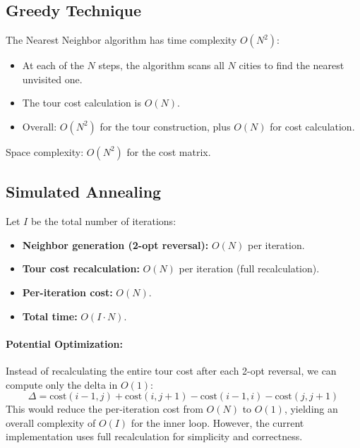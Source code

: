 \documentclass[12pt,a4paper]{article}
\begin{document}
\subsection{Greedy Technique}

The Nearest Neighbor algorithm has time complexity $O(N^2)$:
\begin{itemize}
    \item At each of the $N$ steps, the algorithm scans all $N$ cities to find the nearest unvisited one.
    \item The tour cost calculation is $O(N)$.
    \item Overall: $O(N^2)$ for the tour construction, plus $O(N)$ for cost calculation.
\end{itemize}

Space complexity: $O(N^2)$ for the cost matrix.

\subsection{Simulated Annealing}

Let $I$ be the total number of iterations:
\begin{itemize}
    \item \textbf{Neighbor generation (2-opt reversal):} $O(N)$ per iteration.
    \item \textbf{Tour cost recalculation:} $O(N)$ per iteration (full recalculation).
    \item \textbf{Per-iteration cost:} $O(N)$.
    \item \textbf{Total time:} $O(I \cdot N)$.
\end{itemize}

\paragraph{Potential Optimization:} Instead of recalculating the entire tour cost after each 2-opt reversal, we can compute only the delta in $O(1)$:
\[
\Delta = \text{cost}(i-1, j) + \text{cost}(i, j+1) - \text{cost}(i-1, i) - \text{cost}(j, j+1)
\]
This would reduce the per-iteration cost from $O(N)$ to $O(1)$, yielding an overall complexity of $O(I)$ for the inner loop. However, the current implementation uses full recalculation for simplicity and correctness.
\end{document}
